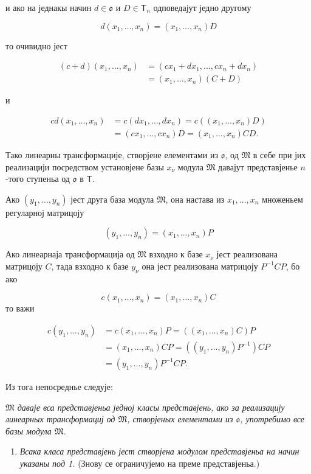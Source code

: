 \documentclass[11pt]{article}
\providecommand{\tightlist}{\setlength{\itemsep}{0pt}\setlength{\parskip}{0pt}}
\begin{document}
и ако на једнакы начин \(d\in\mathfrak{o}\) и \(D\in\mathsf T_n\) одповедајут једно другому

\[
d(x_1,\ldots,x_n)=(x_1,\ldots,x_n)D
\]

то очивидно јест

\[
\begin{aligned}
(c+d)(x_1,\ldots,x_n)
&=(cx_1+dx_1,\ldots,cx_n+dx_n)\\
&=(x_1,\ldots,x_n)(C+D)
\end{aligned}
\]

и

\[
\begin{aligned}
cd(x_1,\ldots,x_n)
&=c(dx_1,\ldots,dx_n)=c((x_1,\ldots,x_n)D)\\
&=(cx_1,\ldots,cx_n)D=(x_1,\ldots,x_n)CD.
\end{aligned}
\]

Тако линеарны трансформације, створјене елементами из \(\mathfrak{o}\), од \(\mathfrak M\) в себе при јих реализацији посредством установјене базы \(x_\nu\) модула \(\mathfrak M\) давајут представјенье \(n\)-того ступеньа од \(\mathfrak{o}\) в \(\mathsf T\).

Ако \((y_1,\ldots,y_n)\) јест друга база модула \(\mathfrak M\), она настава из \(x_1,\ldots,x_n\) множеньем регуларној матрицоју

\[(y_1,\ldots,y_n)=(x_1,\ldots,x_n)P\]

Ако линеарнаја трансформација од \(\mathfrak M\) взходно к базе \(x_\nu\) јест реализована матрицоју \(C\), тада взходно к базе \(y_\nu\) она јест реализована матрицоју \(P^{-1}CP\), бо ако

\[c(x_1,\ldots,x_n)=(x_1,\ldots,x_n)C\]
то важи

\[
\begin{aligned}
c(y_1,\ldots,y_n)
&=c(x_1,\ldots,x_n)P=((x_1,\ldots,x_n)C)P\\
&=(x_1,\ldots,x_n)CP=((y_1,\ldots,y_n)P^{-1})CP\\
&=(y_1,\ldots,y_n)P^{-1}CP.
\end{aligned}
\]

Из тога непосреднье следује:

\emph{\(\mathfrak M\) даваје вса представјеньа једној класы представјень, ако за реализацију линеарных трансформациј од \(\mathfrak M\), створјеных елементами из \(\mathfrak{o}\), употребимо все базы модула \(\mathfrak M\).}

\begin{enumerate}
\def\labelenumi{\arabic{enumi}.}
\setcounter{enumi}{1}
\tightlist
\item
  \emph{Всака класа представјень јест створјена модулом представјеньа на начин указаны под 1.} (Знову се ограничујемо на преме представјеньа.)
\end{enumerate}
\end{document}
